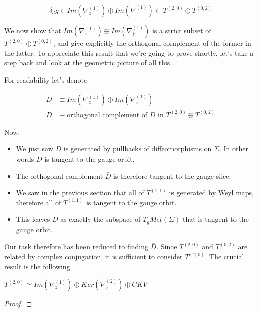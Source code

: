     \begin{equation}
        \delta_d g \in Im(\nabla_z^{(1)}) \oplus Im(\nabla_{\bar z}^{(1)})
        \subset T^{(2,0)} \oplus T^{(0,2)}
    \end{equation}

    We now show that $Im(\nabla_z^{(1)}) \oplus Im(\nabla_{\bar z}^{(1)})$ is a strict subset of $T^{(2,0)} \oplus T^{(0,2)}$, and give explicitly the orthogonal complement of the former in the latter. To appreciate this result that we're going to prove shortly, let's take a step back and look at the geometric picture of all this.

    For readability let's denote

    \begin{align}
        D &\equiv Im(\nabla_z^{(1)}) \oplus Im(\nabla_{\bar z}^{(1)}) \\
        \bar D &\equiv \text{orthogonal complement of } D \text{ in } T^{(2,0)} \oplus T^{(0,2)}
    \end{align}

    Now:

    \begin{itemize}
        \item We just saw $D$ is generated by pullbacks of diffeomorphisms on $\Sigma$. In other words $D$ is tangent to the gauge orbit.
        \item The orthogonal complement $\bar D$ is therefore tangent to the gauge slice.
        \item We saw in the previous section that all of $T^{(1,1)}$ is generated by Weyl maps, therefore all of $T^{(1,1)}$ is tangent to the gauge orbit.
        \item This leaves $\bar D$ as exactly the subspace of $T_g Met(\Sigma)$ that is tangent to the gauge orbit.
    \end{itemize}


    Our task therefore has been reduced to finding $\bar D$. Since $T^{(2, 0)}$ and $T^{(0, 2)}$ are related by complex conjugation, it is sufficient to consider $T^{(2, 0)}$. The crucial result is the following

    \begin{prop}
        $T^{(2,0)} \simeq Im(\nabla^{(1)}_z) \oplus Ker(\nabla^{(2)}_{\bar z}) \oplus CKV$
    \end{prop}

    \begin{proof}
    \end{proof}


